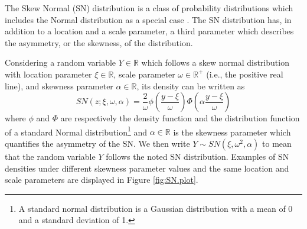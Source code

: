 \documentclass[11pt, oneside]{article}
\begin{document}
The Skew Normal (SN) distribution is a class of probability distributions which includes the Normal distribution as a special case \cite{Azzalini1985}. The SN distribution has, in addition to a location and a scale parameter, a third parameter which describes the asymmetry, or the skewness, of the distribution.  


Considering a random variable $Y\in \mathbb R$ which follows a skew normal distribution with location parameter $\xi \in \mathbb R$, scale parameter $\omega \in \mathbb R^{+}$ (i.e., the positive real line), and skewness parameter $\alpha \in \mathbb R$, its density can be written as 
\begin{equation} \label{def:snd_gen}
SN(z;\xi, \omega, \alpha) = \frac{2}{\omega} \phi\left(\frac{y-\xi}{\omega}\right) \Phi\left(\alpha\frac{y-\xi}{\omega}\right)
\end{equation}
where $\phi$ and $\Phi$ are respectively the density function and the distribution function of a standard Normal distribution\footnote{A standard normal distribution is a Gaussian distribution with a mean of 0 and a standard deviation of 1.}
 and $\alpha \in \mathbb R$ is the skewness parameter which quantifies the asymmetry of the SN.  We then write $Y \sim SN(\xi, \omega^{2}, \alpha)$ to mean that the random variable $Y$ follows the noted SN distribution.
Examples of SN densities under different skewness parameter values and the same location and scale parameters are displayed in Figure \ref{fig:SN.plot}.

\end{document}

